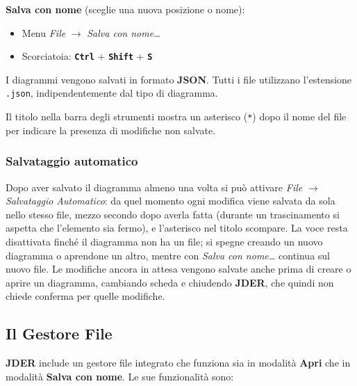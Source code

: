 \documentclass[a4paper,11pt]{article}
\newcommand{\key}[1]{\texttt{\textbf{#1}}}
\newcommand{\menu}[1]{\textit{#1}}
\newcommand{\jder}{\textbf{JDER}}
\begin{document}
\textbf{Salva con nome} (sceglie una nuova posizione o nome):
\begin{itemize}
  \item Menu \menu{File} $\to$ \menu{Salva con nome\ldots}
  \item Scorciatoia: \key{Ctrl} + \key{Shift} + \key{S}
\end{itemize}

I diagrammi vengono salvati in formato \textbf{JSON}. Tutti i file utilizzano l'estensione \texttt{.json},
indipendentemente dal tipo di diagramma.

\begin{tcolorbox}[notebox, title={Nota}]
  Il titolo nella barra degli strumenti mostra un asterisco (\texttt{*}) dopo il nome del file
  per indicare la presenza di modifiche non salvate.
\end{tcolorbox}

\subsubsection{Salvataggio automatico}

Dopo aver salvato il diagramma almeno una volta si può attivare \menu{File} $\to$
\menu{Salvataggio Automatico}: da quel momento ogni modifica viene salvata da sola nello stesso
file, mezzo secondo dopo averla fatta (durante un trascinamento si aspetta che l'elemento sia
fermo), e l'asterisco nel titolo scompare. La voce resta disattivata finché il diagramma non ha
un file; si spegne creando un nuovo diagramma o aprendone un altro, mentre con \menu{Salva con
nome\ldots} continua sul nuovo file. Le modifiche ancora in attesa vengono salvate anche prima di
creare o aprire un diagramma, cambiando scheda e chiudendo \jder{}, che quindi non chiede
conferma per quelle modifiche.

\subsection{Il Gestore File}
\label{sec:filemanager}

\jder{} include un gestore file integrato che funziona sia in modalità \textbf{Apri} che in
modalità \textbf{Salva con nome}. Le sue funzionalità sono:
\end{document}

